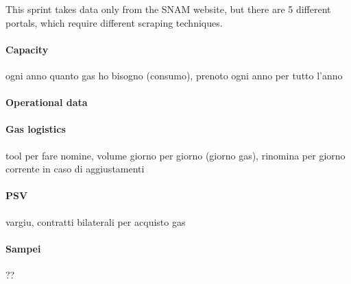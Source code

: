 This sprint takes data only from the SNAM website, but there are 5 different portals, which require different scraping techniques.


\paragraph{Capacity}
    ogni anno quanto gas ho bisogno (consumo), prenoto ogni anno per tutto l'anno
\paragraph{Operational data}
    
\paragraph{Gas logistics}
    tool per fare nomine, volume giorno per giorno (giorno gas), rinomina per giorno corrente in caso di aggiustamenti
\paragraph{PSV}
    vargiu, contratti bilaterali per acquisto gas
\paragraph{Sampei}
    ??
